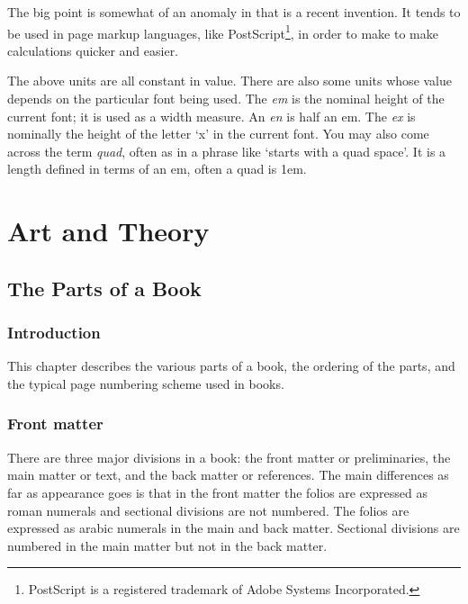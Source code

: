 \documentclass[10pt,letterpaper]{memoir}
\begin{document}
    The big point 
is somewhat of an anomaly in that is a recent
invention. It tends to be used
in page markup languages, like PostScript\footnote{PostScript is a 
registered trademark of Adobe Systems Incorporated.\label{fn:ps}},
in order to make to make calculations quicker and easier.

    The above units are all constant in value. There are also some units
whose value depends on the particular font being used. 
The \textit{em}
is the nominal height of the current font; it is used as a width measure.
An \textit{en} is half an em.
The \textit{ex} is
nominally the height of the letter `x' in the current font. You may also
come across the term \textit{quad}, often as in a phrase
like `starts with a quad space'. It is a length defined in terms of
an em, often a quad is 1em.


\cleardoublepage
{}

\mainmatter

\part{Art and Theory} \label{part:art}

\chapter{The Parts of a Book}

\section{Introduction}

    This chapter describes the various parts of a book, the 
ordering of the parts, and the typical page numbering scheme used
in books. 



\section{Front matter}


    There are three major divisions in a book: 
the front matter or preliminaries, 
the main matter or text, 
and the back matter or references. 
The main differences as
far as appearance goes is that in the front matter the folios are 
expressed as roman numerals and sectional divisions are not numbered. The 
folios are expressed as arabic numerals in the main and back matter. Sectional
divisions are numbered in the main matter but not in the back matter.
\end{document}
